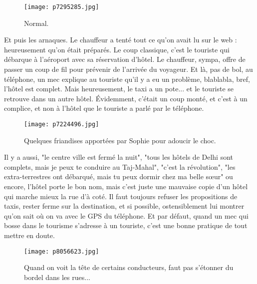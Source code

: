 \documentclass{book}
\begin{document}
\begin{figure}[h]
\centering
\texttt{[image: p7295285.jpg]}
\caption*{Normal.}
\end{figure}

Et puis les arnaques. Le chauffeur a tenté tout ce qu'on avait lu sur le web : heureusement qu'on était préparés. Le coup classique, c'est le touriste qui débarque à l'aéroport avec sa réservation d'hôtel. Le chauffeur, sympa, offre de passer un coup de fil pour prévenir de l'arrivée du voyageur. Et là, pas de bol, au téléphone, un mec explique au touriste qu'il y a eu un problème, blablabla, bref, l'hôtel est complet. Mais heureusement, le taxi a un pote... et le touriste se retrouve dans un autre hôtel. Évidemment, c'était un coup monté, et c'est à un complice, et non à l'hôtel que le touriste a parlé par le téléphone.


\begin{figure}[h]
\centering
\texttt{[image: p7224496.jpg]}
\caption*{Quelques friandises apportées par Sophie pour adoucir le choc.}
\end{figure}

Il y a aussi, "le centre ville est fermé la nuit", "tous les hôtels de Delhi sont complets, mais je peux te conduire au Taj-Mahal", "c'est la révolution", "les extra-terrestres ont débarqué, mais tu peux dormir chez ma belle sœur" ou encore, l'hôtel porte le bon nom, mais c'est juste une mauvaise copie d'un hôtel qui marche mieux la rue d'à coté. Il faut toujours refuser les propositions de taxis, rester ferme sur la destination, et si possible, ostensiblement lui montrer qu'on sait où on va avec le GPS du téléphone. Et par défaut, quand un mec qui bosse dans le tourisme s'adresse à un touriste, c'est une bonne pratique de tout mettre en doute.


\begin{figure}[h]
\centering
\texttt{[image: p8056623.jpg]}
\caption*{Quand on voit la tête de certains conducteurs, faut pas s'étonner du bordel dans les rues...}
\end{figure}
\end{document}
